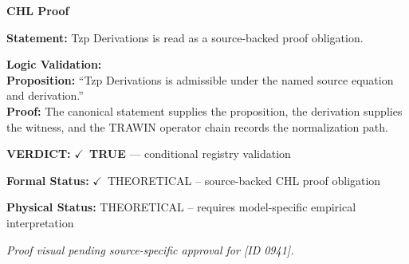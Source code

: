\vspace{0.45em}
\noindent\textbf{CHL Proof}\par
\textbf{Statement:} Tzp Derivations is read as a source-backed proof obligation.

\textbf{Logic Validation:}\\
\textbf{Proposition:} ``Tzp Derivations is admissible under the named source equation and derivation.''\\
\textbf{Proof:} The canonical statement supplies the proposition, the derivation supplies the witness, and the TRAWIN operator chain records the normalization path.

\textbf{VERDICT:} \ensuremath{\checkmark}\ \textbf{TRUE} --- conditional registry validation

\textbf{Formal Status:} \ensuremath{\checkmark}\ THEORETICAL -- source-backed CHL proof obligation

\textbf{Physical Status:} THEORETICAL -- requires model-specific empirical interpretation
\par\vspace{0.45em}
\par
\vfill
\begingroup\footnotesize\itshape
Proof visual pending source-specific approval for [ID 0941].
\par\endgroup
\vfill
\endgroup
\endgroup
